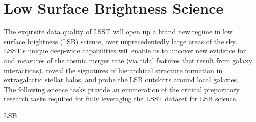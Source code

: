 \section{Low Surface Brightness Science}\label{sec:tasks:lsb}  
{\justify
The exquisite data quality of LSST will open up a brand new regime in
low surface brightness (LSB) science, over unprecedentedly large areas of the sky. LSST's unique deep-wide capabilities will enable us to uncover new evidence for and measures of the cosmic merger rate (via tidal features that result from galaxy interactions), reveal the signatures of hierarchical structure formation in extragalactic stellar halos, and probe the LSB outskirts around local galaxies. The following science tasks provide an enumeration of the critical preparatory research tasks required for fully leveraging the LSST dataset for LSB science.  

\begin{tasklist}{LSB}

\end{tasklist}}
